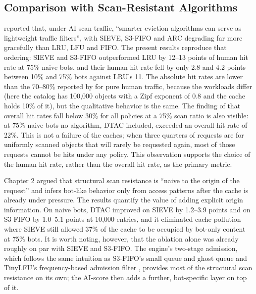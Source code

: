 \subsection{Comparison with Scan-Resistant Algorithms}
 reported that, under AI scan traffic, ``smarter eviction algorithms can serve as lightweight traffic filters'', with SIEVE, S3-FIFO and ARC degrading far more gracefully than LRU, LFU and FIFO. The present results reproduce that ordering: SIEVE and S3-FIFO outperformed LRU by 12--13 points of human hit rate at 75\% naive bots, and their human hit rate fell by only 2.8 and 4.2 points between 10\% and 75\% bots against LRU's 11. The absolute hit rates are lower than the 70--80\% reported by  for pure human traffic, because the workloads differ (here the catalog has 100{,}000 objects with a Zipf exponent of 0.8 and the cache holds 10\% of it), but the qualitative behavior is the same. The finding of  that overall hit rates fall below 30\% for all policies at a 75\% scan ratio is also visible: at 75\% naive bots no algorithm, DTAC included, exceeded an overall hit rate of 22\%. This is not a failure of the caches; when three quarters of requests are for uniformly scanned objects that will rarely be requested again, most of those requests cannot be hits under any policy. This observation supports the choice of the human hit rate, rather than the overall hit rate, as the primary metric.

Chapter 2 argued that structural scan resistance is ``naive to the origin of the request'' and infers bot-like behavior only from access patterns after the cache is already under pressure. The results quantify the value of adding explicit origin information. On naive bots, DTAC improved on SIEVE by 1.2--3.9 points and on S3-FIFO by 1.0--5.1 points at 10{,}000 entries, and it eliminated cache pollution where SIEVE still allowed 37\% of the cache to be occupied by bot-only content at 75\% bots. It is worth noting, however, that the ablation alone was already roughly on par with SIEVE and S3-FIFO. The engine's two-stage admission, which follows the same intuition as S3-FIFO's small queue and ghost queue \cite{yang_fifo_2023} and TinyLFU's frequency-based admission filter \cite{einziger_tinylfu_2017}, provides most of the structural scan resistance on its own; the AI-score then adds a further, bot-specific layer on top of it.

